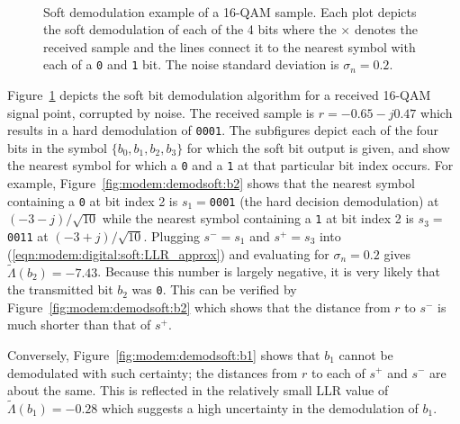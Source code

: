 %
\begin{figure}
\centering
\mbox{
   \quad
   \quad
}
\mbox{
   \quad
   \quad
}
\caption{
    Soft demodulation example of a 16-QAM sample.
    Each plot depicts the soft demodulation of each of the 4 bits where
    the $\times$ denotes the received sample and the lines connect it to
    the nearest symbol with each of a {\tt 0} and {\tt 1} bit. %
    The noise standard deviation is $\sigma_n=0.2$.
}
\label{fig:modem:demodsoft}
\end{figure}
%
Figure~\ref{fig:modem:demodsoft} depicts the soft bit demodulation
algorithm for a received 16-QAM signal point, corrupted by noise.
The received sample is $r = -0.65 - j0.47$ which results in a hard
demodulation of {\tt 0001}.
The subfigures depict each of the four bits in the symbol 
$\{b_0,b_1,b_2,b_3\}$
for which the
soft bit output is given, and show the nearest symbol for which a
{\tt 0} and a {\tt 1} at that particular bit index occurs.
For example, Figure~\ref{fig:modem:demodsoft:b2} shows that
the nearest symbol containing a {\tt 0} at bit index 2
is $s_1=${\tt 0001} (the hard decision demodulation)
at $(-3 - j)/\sqrt{10}$
while
the nearest symbol containing a {\tt 1} at bit index 2
is $s_3=${\tt 0011}
at $(-3 + j)/\sqrt{10}$.
Plugging $s^-=s_1$ and $s^+=s_3$ into
(\ref{eqn:modem:digital:soft:LLR_approx})
and evaluating for $\sigma_n=0.2$ gives
$\tilde{\Lambda}(b_2) = -7.43$.
Because this number is largely negative, it is very likely that the
transmitted bit $b_2$ was {\tt 0}.
This can be verified by Figure~\ref{fig:modem:demodsoft:b2} which shows
that the distance from $r$ to $s^-$ is much shorter than that of $s^+$.

Conversely, Figure~\ref{fig:modem:demodsoft:b1} shows that $b_1$ cannot
be demodulated with such certainty;
the distances from $r$ to each of $s^+$ and $s^-$ are about the same.
This is reflected in the relatively small LLR value of
$\tilde{\Lambda}(b_1)=-0.28$ which suggests a high uncertainty in the
demodulation of $b_1$.
%

